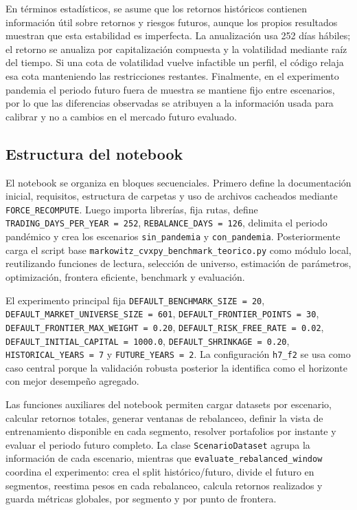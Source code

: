 En t\'erminos estad\'isticos, se asume que los retornos hist\'oricos contienen
informaci\'on \'util sobre retornos y riesgos futuros, aunque los propios
resultados muestran que esta estabilidad es imperfecta. La anualizaci\'on usa
252 d\'ias h\'abiles; el retorno se anualiza por capitalizaci\'on compuesta y la
volatilidad mediante ra\'iz del tiempo. Si una cota de volatilidad vuelve
infactible un perfil, el c\'odigo relaja esa cota manteniendo las restricciones
restantes. Finalmente, en el experimento pandemia el periodo futuro fuera de
muestra se mantiene fijo entre escenarios, por lo que las diferencias observadas
se atribuyen a la informaci\'on usada para calibrar y no a cambios en el mercado
futuro evaluado.

\subsection*{Estructura del notebook}

El notebook se organiza en bloques secuenciales. Primero define la
documentaci\'on inicial, requisitos, estructura de carpetas y uso de archivos
cacheados mediante \texttt{FORCE\_RECOMPUTE}. Luego importa librer\'ias, fija
rutas, define \texttt{TRADING\_DAYS\_PER\_YEAR = 252},
\texttt{REBALANCE\_DAYS = 126}, delimita el periodo pand\'emico y crea los
escenarios \texttt{sin\_pandemia} y \texttt{con\_pandemia}. Posteriormente carga
el script base \texttt{markowitz\_cvxpy\_benchmark\_teorico.py} como m\'odulo
local, reutilizando funciones de lectura, selecci\'on de universo, estimaci\'on
de par\'ametros, optimizaci\'on, frontera eficiente, benchmark y evaluaci\'on.

El experimento principal fija \texttt{DEFAULT\_BENCHMARK\_SIZE = 20},\\
\texttt{DEFAULT\_MARKET\_UNIVERSE\_SIZE = 601},
\texttt{DEFAULT\_FRONTIER\_POINTS = 30},
\texttt{DEFAULT\_FRONTIER\_MAX\_WEIGHT = 0.20},
\texttt{DEFAULT\_RISK\_FREE\_RATE = 0.02},
\texttt{DEFAULT\_INITIAL\_CAPITAL = 1000.0},
\texttt{DEFAULT\_SHRINKAGE = 0.20},\\
\texttt{HISTORICAL\_YEARS = 7} y \texttt{FUTURE\_YEARS = 2}. La configuraci\'on
\texttt{h7\_f2} se usa como caso central porque la validaci\'on robusta posterior
la identifica como el horizonte con mejor desempe\~no agregado.

Las funciones auxiliares del notebook permiten cargar datasets por escenario,
calcular retornos totales, generar ventanas de rebalanceo, definir la vista de
entrenamiento disponible en cada segmento, resolver portafolios por instante y
evaluar el periodo futuro completo. La clase \texttt{ScenarioDataset} agrupa la
informaci\'on de cada escenario, mientras que
\texttt{evaluate\_rebalanced\_window} coordina el experimento: crea el split
hist\'orico/futuro, divide el futuro en segmentos, reestima pesos en cada
rebalanceo, calcula retornos realizados y guarda m\'etricas globales, por
segmento y por punto de frontera.

